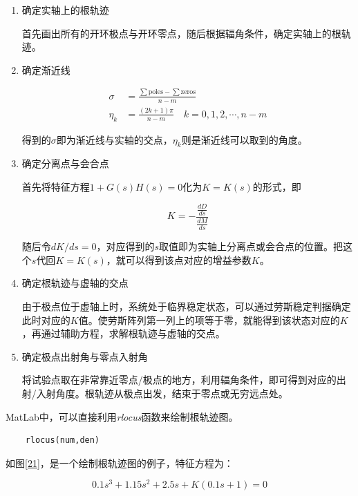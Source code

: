 \begin{enumerate}
    \item 确定实轴上的根轨迹
    
    首先画出所有的开环极点与开环零点，随后根据辐角条件，确定实轴上的根轨迹。

    \item 确定渐近线
    
    \begin{align*}
        \sigma&=\frac{\sum\mbox{poles}-\sum\mbox{zeros}}{n-m}\\
        \eta_k&=\frac{(2k+1)\pi}{n-m}\quad k=0,1,2,\cdots ,n-m
    \end{align*}

    得到的$\sigma$即为渐近线与实轴的交点，$\eta_k$则是渐近线可以取到的角度。

    \item 确定分离点与会合点
    
    首先将特征方程$1+G(s) H(s)=0$化为$K=K(s)$的形式，即

    \begin{equation*}
        K=-\frac{\frac{dD}{ds}}{\frac{dM}{ds}}
    \end{equation*}

    随后令$dK/ds=0$，对应得到的$s$取值即为实轴上分离点或会合点的位置。把这个$s$代回$K=K(s)$，就可以得到该点对应的增益参数$K$。

    \item 确定根轨迹与虚轴的交点
    
    由于极点位于虚轴上时，系统处于临界稳定状态，可以通过劳斯稳定判据确定此时对应的$K$值。使劳斯阵列第一列上的项等于零，就能得到该状态对应的$K$，再通过辅助方程，求解根轨迹与虚轴的交点。

    \item 确定极点出射角与零点入射角
    
    将试验点取在非常靠近零点/极点的地方，利用辐角条件，即可得到对应的出射/入射角度。根轨迹从极点出发，结束于零点或无穷远点处。

\end{enumerate}

MatLab中，可以直接利用\textit{rlocus}函数来绘制根轨迹图。

\begin{lstlisting}
    rlocus(num,den)
\end{lstlisting}

如图\ref{21}，是一个绘制根轨迹图的例子，特征方程为：

\begin{equation*}
    0.1s^3+1.15s^2+2.5s+K(0.1s+1)=0
\end{equation*}

